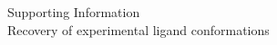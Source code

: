 \documentclass[12pt]{article}
\begin{document}
\begin{center}
{\Large Supporting Information}\\[0.4em]
{\small Recovery of experimental ligand conformations}
\end{center}

\begingroup
\setlength{\emergencystretch}{1em}
\printbibliography
\endgroup
\end{document}

